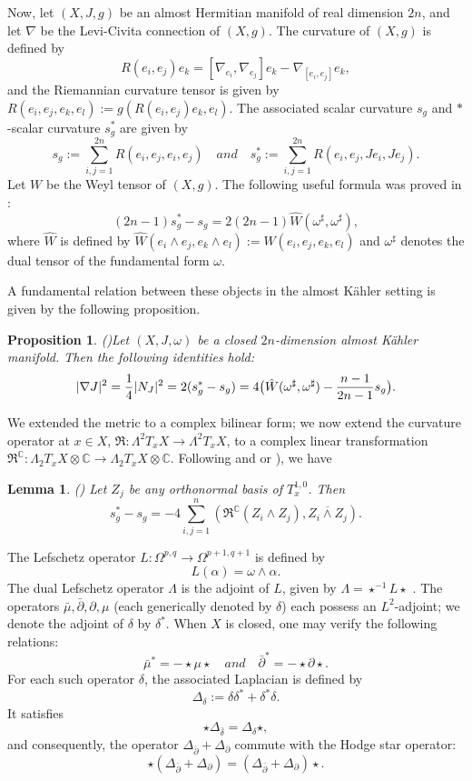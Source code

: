 \documentclass[12pt, twoside]{article}
\newtheorem{lemma}[theorem]{Lemma}
\newtheorem{proposition}[theorem]{Proposition}
\theoremstyle{definition}
\numberwithin{equation}{section}
\def \C {\mathbb{C}}
\def \a {\alpha }
\def \de {\delta}
\def \De {\Delta}
\def \La {\Lambda}
\def\w {\omega}
\def\Om{\Omega}
\def\pa{\partial}
\def\na {\nabla}
\begin{document}
Now, let $(X,J,g)$ be an almost Hermitian manifold of real dimension $2n$, and let $\na$ be the Levi-Civita connection of $(X,g)$. The curvature of $(X,g)$ is defined by 
\[R(e_{i},e_{j})e_{k}=[\na_{e_{i}},\na_{e_{j}}]e_{k}-\na_{[e_{i},e_{j}]}e_{k},\]and the Riemannian curvature tensor is given by $R(e_{i},e_{j},e_{k},e_{l}):=g(R(e_{i},e_{j})e_{k},e_{l})$. 
The associated scalar curvature \(s_g\) and \(\ast\)-scalar curvature \(s_g^*\) are given by
\[s_{g}:=\sum_{i,j=1}^{2n}R(e_{i},e_{j},e_{i},e_{j})\quad and\quad s_{g}^{\ast}:=\sum_{i,j=1}^{2n}R(e_{i},e_{j},Je_{i},Je_{j}).\] 
Let $W$ be the Weyl tensor of $(X,g)$. The following useful formula was proved in \cite{dRS}:
\[(2n-1)s_{g}^{\ast}-s_{g}=2(2n-1)\hat{W}(\w^{\sharp},\w^{\sharp}),\]
where $\hat{W}$ is defined by $\hat{W}(e_{i}\wedge e_{j},e_{k}\wedge e_{l}):=W(e_{i},e_{j},e_{k},e_{l})$ 
and $\w^{\sharp}$ denotes the dual tensor of the fundamental form $\w$.

A fundamental relation between these objects in the almost Kähler setting is given by the following proposition.
\begin{proposition}(\cite[Lemma 2.4]{Sek})\label{Pro4}
	Let $(X,J,\w)$ be a closed $2n$-dimension almost K\"{a}hler manifold. Then the following identities hold:
	\[|\na{J}|^{2}=\frac{1}{4}|N_J|^{2}=2(s_{g}^{\ast}-s_{g})=4\big{(}\hat{W}(\w^{\sharp},\w^{\sharp})-\frac{n-1}{2n-1}s_{g}\big{)}.\]
\end{proposition}

We extended the metric to a complex bilinear form; we now extend the curvature operator at $x\in X$,
 $\mathfrak{R}:\La^{2}T_{x}X\rightarrow\La^{2}T_{x}X$, to a complex linear transformation $\mathfrak{R}^{\C}:
 \La_{2}T_{x}X\otimes\C\rightarrow \La_{2}T_{x}X\otimes\C$.  Following \cite[Lemma 3.3]{Her00} and \cite[Lemma 2.4 ]{Sek} 
 or \cite[Equation (3.1)--(3.3)]{SV}), we have

\begin{lemma}(\cite[Lemma 3.3]{Her00})
Let $Z_{j}$ be any orthonormal basis of $T_{x}^{1,0}$. Then
\[s^{\ast}_{g}-s_{g}=-4\sum_{i,j=1}^{n}(\mathfrak{R}^{\C}(Z_{i}\wedge Z_{j}),\overline{Z_{i}\wedge Z_{j} } ) .\]
\end{lemma}
The Lefschetz operator  $L:\Om^{p,q}\rightarrow\Om^{p+1,q+1}$ is defined by
\[L(\a)=\w\wedge\a.\]
The dual Lefschetz operator $\La$ is the adjoint of $L$, given by $\La=\star^{-1} L\star$ \cite{Huy}. 
The operators \(\bar{\mu}, \bar{\partial}, \partial, \mu \) (each generically denoted by \(\delta\)) each possess an \(L^2\)-adjoint;
we denote the adjoint of \(\delta\) by \(\delta^* \).
When $X$ is closed, one may verify the following relations: \[\bar{\mu}^{\ast}=-\star\mu\star\quad and\quad\bar{\pa}^{\ast}=-\star\pa\star.\]
For each such operator $\de$, the associated Laplacian is defined by
\[\De_{\de}:=\de\de^{\ast}+\de^{\ast}\de.\]
It satisfies
\[\star\De_{\bar{\de}}=\De_{\de}\star,\]
and consequently, the operator $\De_{\bar{\pa}}+\De_{\pa}$ commute with the Hodge star operator:
\[\star(\De_{\bar{\pa}}+\De_{\pa})=(\De_{\bar{\pa}}+\De_{\pa})\star.\]
\end{document}
